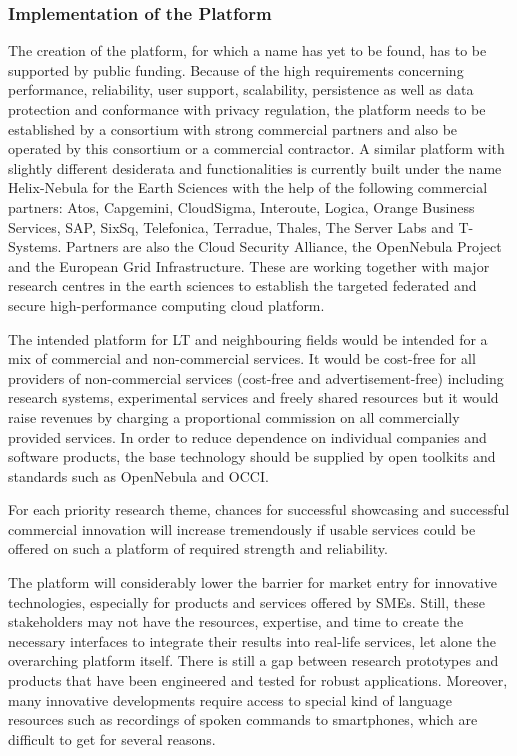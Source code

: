 \documentclass[10pt, plain]{../../metanetpaper}
\begin{document}
\begin{multicols}{2}
 
\subsubsection{Implementation of the Platform}
\label{sec:implementation-of-platform}

The creation of the platform, for which a name has yet to be found, has to be supported by public funding. Because of the high requirements concerning performance, reliability, user support, scalability, persistence as well as data protection and conformance with privacy regulation, the platform needs to be established by a consortium with strong commercial partners and also be operated by this consortium or a commercial contractor. A similar platform with slightly different desiderata and functionalities is currently built under the name Helix-Nebula for the Earth Sciences with the help of the following commercial partners: Atos, Capgemini, CloudSigma, Interoute, Logica, Orange Business Services, SAP, SixSq, Telefonica, Terradue, Thales, The Server Labs and T-Systems. Partners are also the Cloud Security Alliance, the OpenNebula Project and the European Grid Infrastructure. These are working together with major research centres in the earth sciences to establish the targeted federated and secure high-performance computing cloud platform.
 
The intended platform for LT and neighbouring fields would be intended for a mix of commercial and non-commercial services. It would be cost-free for all providers of non-commercial services (cost-free and advertisement-free) including research systems, experimental services and freely shared resources but it would raise revenues by charging a proportional commission on all commercially provided services. In order to reduce dependence on individual companies and software products, the base technology should be supplied by open toolkits and standards such as OpenNebula and OCCI.  
 
For each priority research theme, chances for successful showcasing and successful commercial innovation will increase tremendously if usable services could be offered on such a platform of required strength and reliability.
 
The platform will considerably lower the barrier for market entry for innovative technologies, especially for products and services offered by SMEs. Still, these stakeholders may not have the resources, expertise, and time to create the necessary interfaces to integrate their results into real-life services, let alone the overarching platform itself. There is still a gap between research prototypes and products that have been engineered and tested for robust applications. Moreover, many innovative developments require access to special kind of language resources such as recordings of spoken commands to smartphones, which are difficult to get for several reasons.
 

\end{multicols}
\end{document}
